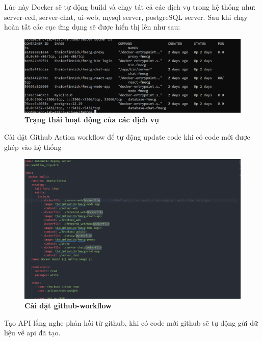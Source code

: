   Lúc này Docker sẽ tự động build và chạy tát cả các dịch vụ trong hệ thống như: server-ecd, server-chat, ui-web, mysql server, postgreSQL server. Sau khi chạy hoàn tất các cục ứng dụng sẽ được hiển thị lên như sau:

  \begin{figure}[H]
    \centering
    \includegraphics[scale=0.5]{Images/server/deploy/docker-container.png}
    \caption[Trạng thái hoạt động của các dịch vụ]{\bfseries \fontsize{12pt}{0pt}
    \selectfont Trạng thái hoạt động của các dịch vụ}
    \label{docker-container-status} %
  \end{figure}

  Cài đặt Github Action workflow để tự động update code khi có code mới được ghép vào hệ thống 
 
  \begin{figure}[H]
    \centering
    \includegraphics[scale=0.5]{Images/server/deploy/github-workflow.png}
    \caption[Cài đặt github-workflow]{\bfseries \fontsize{12pt}{0pt}
    \selectfont Cài đặt github-workflow}
    \label{github-workflow} %
  \end{figure}

  Tạo API lắng nghe phản hồi từ github, khi có code mới github sẽ tự động gửi dữ liệu về api đã tạo.

